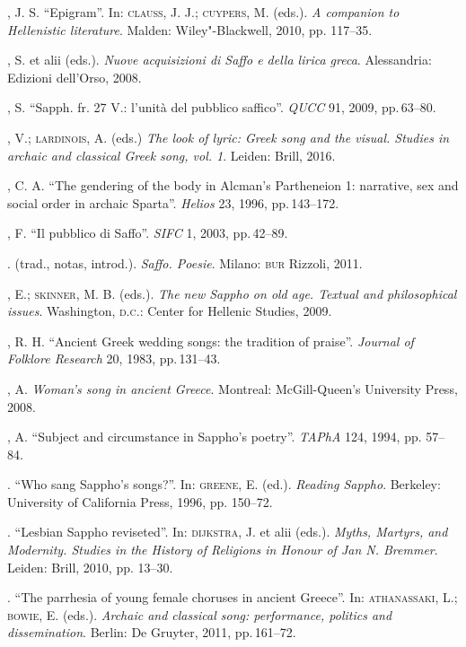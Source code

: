 \begin{bibliohedra}
, J. S. “Epigram”. In: \textsc{clauss}, J. J.; \textsc{cuypers}, M. (eds.). \textit{A companion to Hellenistic literature}. Malden: Wiley"-Blackwell, 2010, pp. 117--35. 

, S. et alii (eds.). \textit{Nuove acquisizioni di Saffo e della lirica greca}. Alessandria: Edizioni dell'Orso, 2008.

, S. “Sapph. fr. 27 V.: l’unità del pubblico saffico”. \textit{QUCC} 91, 2009, pp.\,63--80.

, V.; \textsc{lardinois}, A. (eds.) \textit{The look of lyric: Greek song and the visual. Studies in archaic and classical Greek song, vol. 1}. Leiden: Brill, 2016.

, C. A. “The gendering of the body in Alcman’s Partheneion 1: narrative, sex and social order in archaic Sparta”. \textit{Helios} 23, 1996, pp.\,143--172.

, F. “Il pubblico di Saffo”. \textit{SIFC} 1, 2003, pp.\,42--89.

\titidem. (trad., notas, introd.). \textit{Saffo. Poesie}. Milano: \textsc{bur} Rizzoli, 2011.

, E.; \textsc{skinner}, M. B. (eds.). \textit{The new Sappho on old age. Textual and philosophical issues}. Washington, \textsc{d.c.}: Center for Hellenic Studies, 2009.

, R. H. “Ancient Greek wedding songs: the tradition of praise”. \textit{Journal of Folklore Research} 20, 1983, pp.\,131--43.

, A. \textit{Woman’s song in ancient Greece}. Montreal: McGill-Queen’s University Press, 2008. 

, A. “Subject and circumstance in Sappho’s poetry”. \textit{TAPhA} 124, 1994, pp. 57--84.

\titidem. “Who sang Sappho’s songs?”. In: \textsc{greene}, E. (ed.). \textit{Reading Sappho}. Berkeley: University of California Press, 1996, pp. 150--72.

\titidem. ``Lesbian Sappho reviseted''. In: \textsc{dijkstra}, J. et alii (eds.). \textit{Myths, Martyrs, and Modernity. Studies in the History of Religions in Honour of Jan N. Bremmer}. Leiden: Brill, 2010, pp. 13--30.

\titidem. “The parrhesia of young female choruses in ancient Greece”. In: \textsc{athanassaki}, L.; \textsc{bowie}, E. (eds.). \textit{Archaic and classical song: performance, politics and dissemination}. Berlin: De Gruyter, 2011, pp.\,161--72. 


\end{bibliohedra}
